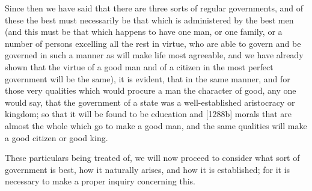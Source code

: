 
Since then we have said that there are three sorts of regular governments,
and of these the best must necessarily be that which is administered by
the best men (and this must be that which happens to have one man, or one
family, or a number of persons excelling all the rest in virtue, who are
able to govern and be governed in such a manner as will make life most
agreeable, and we have already shown that the virtue of a good man and of
a citizen in the most perfect government will be the same), it is evident,
that in the same manner, and for those very qualities which would procure
a man the character of good, any one would say, that the government of a
state was a well-established aristocracy or kingdom; so that it will be
found to be education and [1288b] morals that are almost the whole which
go to make a good man, and the same qualities will make a good citizen or
good king.

These particulars being treated of, we will now proceed to consider what
sort of government is best, how it naturally arises, and how it is
established; for it is necessary to make a proper inquiry concerning this.



